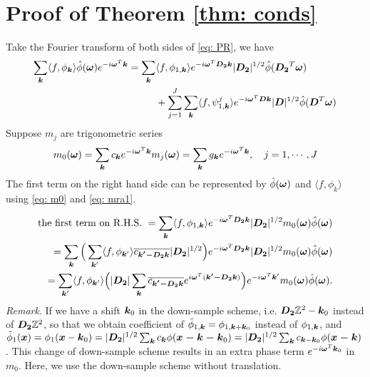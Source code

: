\section{Proof of Theorem \ref{thm: conds}}\label{app: cond-thm}
Take the Fourier transform of both sides of \eqref{eq: PR}, we have 
\begin{align*}
\sum_{\boldsymbol{k}}\langle f,\phi_{\boldsymbol{k}}\rangle\hat{\phi}(\boldsymbol{\omega})e^{-i\boldsymbol{\omega}^T\boldsymbol{k}} = \sum_{\boldsymbol{k}}&\langle f,\phi_{1,\boldsymbol{k}}\rangle e^{-i\boldsymbol{\omega}^T\boldsymbol{D_2k}}|\boldsymbol{D_2}|^{1/2}\hat{\phi}(\boldsymbol{D_2}^T\boldsymbol{\omega}) \\
&+ \sum_{j=1}^J\sum_{\boldsymbol{k}}\langle f,\psi^j_{1,\boldsymbol{k}}\rangle e^{-i\boldsymbol{\omega}^T\boldsymbol{Dk}}|\boldsymbol{D}|^{1/2}\hat{\phi}(\boldsymbol{D}^T\boldsymbol{\omega})
\end{align*}
Suppose $m_j$ are trigonometric series
\begin{align}\label{eq: mra1}
m_0(\V{\omega}) = \sum_{\V{k}} c_{\V{k}}e^{-i \V{\omega}^T\V{k}} \hfill
m_j(\V{\omega}) = \sum_{\V{k}} g_{\V{k}}e^{-i \V{\omega}^T\V{k}},\quad j=1,\cdots,J
\end{align}
The first term on the right hand side can be represented by $\hat{\phi}(\boldsymbol{\omega})$ and $\langle f,\phi_k\rangle$ using \eqref{eq: m0} and \eqref{eq: mra1}.

\begin{align*}
\text{the first term on R.H.S. } = \sum_{\boldsymbol{k}}\langle f,\phi_{1,\boldsymbol{k}}\rangle e^{-i\boldsymbol{\omega}^T\boldsymbol{D_2k}}|\boldsymbol{D_2}|^{1/2}m_0(\boldsymbol{\omega})\hat{\phi}(\boldsymbol{\omega}) \\= \sum_{\boldsymbol{k}}\Big(\sum_{\boldsymbol{k}'}\langle f,\phi_{\boldsymbol{k}'}\rangle\overline{c_{\boldsymbol{k'-D_2k}}}|\boldsymbol{D_2}|^{1/2}\Big)e^{-i\boldsymbol{\omega}^T\boldsymbol{D_2k}}|\boldsymbol{D_2}|^{1/2}m_0(\boldsymbol{\omega})\hat{\phi}(\boldsymbol{\omega})\\
=\sum_{\boldsymbol{k}'}\langle f,\phi_{\boldsymbol{k}'}\rangle\Big(|\boldsymbol{D_2}|\sum_{\boldsymbol{k}}\overline{c_{\boldsymbol{k'-D_2k}}}e^{i\boldsymbol{\omega}^T(\boldsymbol{k'-D_2k})}\Big)e^{-i\boldsymbol{\omega} ^T\boldsymbol{k}'} m_0(\boldsymbol{\omega})\hat{\phi}(\boldsymbol{\omega}).
\end{align*}
{\it Remark}.
If we have a shift $\boldsymbol{k}_0$ in the down-sample scheme, i.e. $\boldsymbol{D_2}\mathbb{Z}^2 - \boldsymbol{k}_0$ instead of $\boldsymbol{D_2}\mathbb{Z}^2$, so that we obtain coefficient of $\tilde{\phi}_{1,\boldsymbol{k}} = \phi_{1,\boldsymbol{k}+\boldsymbol{k}_0}$ instead of $\phi_{1,\boldsymbol{k}}$, and $\tilde{\phi}_1(\boldsymbol{x}) =\phi_1(\boldsymbol{x}-\boldsymbol{k}_0)= |\boldsymbol{D_2}|^{1/2}\sum_{\boldsymbol{k}}c_{\boldsymbol{k}}\phi(\boldsymbol{x-k-k}_0) = |\boldsymbol{D_2}|^{1/2}\sum_{\boldsymbol{k}}c_{\boldsymbol{k}-\boldsymbol{k}_0}\phi(\boldsymbol{x-k})$. This change of down-sample scheme results in an extra phase term $e^{-i\boldsymbol{\omega}^T \boldsymbol{k}_0}$ in $m_0$. Here, we use the down-sample scheme without translation.

